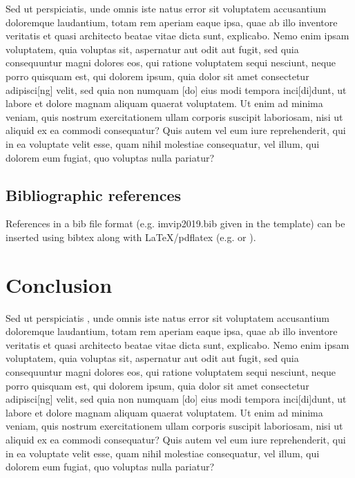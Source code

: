 \documentclass[a4paper,11pt]{article}
\begin{document}
Sed ut perspiciatis, unde omnis iste natus error sit voluptatem accusantium doloremque laudantium, totam rem aperiam eaque ipsa, quae ab illo inventore veritatis et quasi architecto beatae vitae dicta sunt, explicabo. Nemo enim ipsam voluptatem, quia voluptas sit, aspernatur aut odit aut fugit, sed quia consequuntur magni dolores eos, qui ratione voluptatem sequi nesciunt, neque porro quisquam est, qui dolorem ipsum, quia dolor sit amet consectetur adipisci[ng] velit, sed quia non numquam [do] eius modi tempora inci[di]dunt, ut labore et dolore magnam aliquam quaerat voluptatem. Ut enim ad minima veniam, quis nostrum exercitationem ullam corporis suscipit laboriosam, nisi ut aliquid ex ea commodi consequatur? Quis autem vel eum iure reprehenderit, qui in ea voluptate velit esse, quam nihil molestiae consequatur, vel illum, qui dolorem eum fugiat, quo voluptas nulla pariatur?

\subsection{Bibliographic references}
References in a bib file format (e.g. imvip2019.bib given in the template) can be inserted using bibtex along with
\LaTeX\xspace/pdflatex (e.g.  \cite{hartley} or  \cite{jain, goodfellow}). 

\section{Conclusion}

Sed ut perspiciatis , unde omnis iste natus error sit voluptatem accusantium doloremque laudantium, totam rem aperiam eaque ipsa, quae ab illo inventore veritatis et quasi architecto beatae vitae dicta sunt, explicabo. Nemo enim ipsam voluptatem, quia voluptas sit, aspernatur aut odit aut fugit, sed quia consequuntur magni dolores eos, qui ratione voluptatem sequi nesciunt, neque porro quisquam est, qui dolorem ipsum, quia dolor sit amet consectetur adipisci[ng] velit, sed quia non numquam [do] eius modi tempora inci[di]dunt, ut labore et dolore magnam aliquam quaerat voluptatem. Ut enim ad minima veniam, quis nostrum exercitationem ullam corporis suscipit laboriosam, nisi ut aliquid ex ea commodi consequatur? Quis autem vel eum iure reprehenderit, qui in ea voluptate velit esse, quam nihil molestiae consequatur, vel illum, qui dolorem eum fugiat, quo voluptas nulla pariatur?
\end{document}
